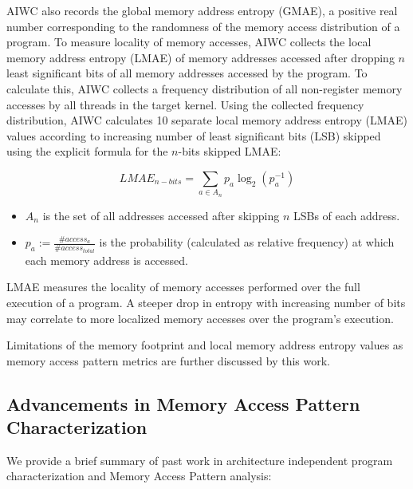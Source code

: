 \documentclass[review=false, sigchi]{acmart}
\begin{document}
	AIWC also records the global memory address entropy (GMAE), a positive real number corresponding to the randomness of the memory access distribution of a program. To measure locality of memory accesses, AIWC collects the local memory address entropy (LMAE) of memory addresses accessed after dropping $n$ least significant bits of all memory addresses accessed by the program. To calculate this, AIWC collects a frequency distribution of all non-register memory accesses by all threads in the target kernel. Using the collected frequency distribution, AIWC calculates 10 separate local memory address entropy (LMAE) values according to increasing number of least significant bits (LSB) skipped using
	the explicit formula for the $n$-bits skipped LMAE:
	
	\begin{equation}
	LMAE_{n-bits} = \sum_{a \in A_n}p_a \log_2(p_a^{-1})
	\end{equation}
	
	\begin{itemize}
		\item $A_n$ is the set of all addresses accessed after skipping $n$ LSBs of each address.
		\item $p_a := \frac{\#access_a}{\#access_{total}}$ is the probability (calculated as relative frequency) at which each memory address is accessed.
	\end{itemize}
	
	LMAE measures the locality of memory accesses performed over the full execution of a program. A steeper drop in entropy with increasing number of bits may correlate to more localized memory accesses over the program's execution.
	
	Limitations of the memory footprint and local memory address entropy values as memory access pattern metrics are further discussed by this work. %
	
	\subsection{Advancements in Memory Access Pattern Characterization}
	
	We provide a brief summary of past work in architecture independent program characterization and Memory Access Pattern analysis:
	
\end{document}
